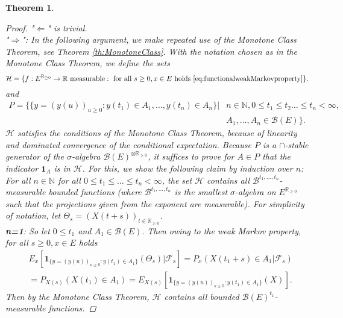 \documentclass[12pt,a4paper]{scrartcl}
\newtheorem{theorem}{Theorem}[section]
\numberwithin{equation}{section}
\newcommand{\R}{\mathbb{R}} %
\newcommand{\N}{\mathbb{N}} %
\begin{document}
\begin{theorem}
\begin{proof}
"$\Leftarrow$" is trivial.\\
"$\Rightarrow$": In the following argument, we make repeated use of the Monotone Class Theorem, see Theorem \ref{th:MonotoneClass}. With the notation chosen as in the Monotone Class Theorem, we define the sets
$$\mathcal{H} = \lbrace f: E^{\R_{\geq 0}} \to \R \textnormal{ measurable}: \textnormal{ for all } s \geq 0, x \in E \textnormal{ holds \eqref{eq:functionalweakMarkovproperty}} \rbrace. $$ and
\begin{align*}
P = \lbrace \lbrace y = \left(y\left(u\right) \right)_{u \geq 0}: y\left(t_1\right) \in A_1, \ldots , y\left(t_n\right) \in A_n \rbrace |& n \in \N, 0 \leq t_1 \leq t_2 \ldots \leq t_n < \infty, \\
&A_1, \ldots , A_n \in \mathcal{B}\left(E\right) \rbrace.
\end{align*}
$\mathcal{H}$ satisfies the conditions of the Monotone Class Theorem, because of linearity and dominated convergence of the conditional expectation. Because $P$ is a $\cap$-stable generator of the $\sigma$-algebra $\mathcal{B}\left(E\right)^{\otimes \R_{\geq 0}}$, it suffices to prove for $A \in P$ that the indicator $\textbf{1}_A$ is in $\mathcal{H}$. For this, we show the following claim by induction over $n$:\\
For all $n \in \N$ for all $0 \leq t_1 \leq \ldots \leq t_n < \infty $, the set $\mathcal{H}$ contains all $\mathcal{B}^{t_1,\ldots,t_n}$-measurable bounded functions (where $\mathcal{B}^{t_1,\ldots,t_n}$ is the smallest $\sigma$-algebra on $E^{\R_{\geq 0}}$ such that the projections given from the exponent are measurable). For simplicity of notation, let $\Theta_s = \left(X\left(t+s\right)\right)_{t \in \R_{\geq 0}}$.\\
\textbf{n=1}: So let $0 \leq t_1$ and $A_1 \in \mathcal{B}\left(E\right).$ Then owing to the weak Markov property, for all $s\geq 0, x \in E$ holds 
\begin{align*}
&E_x\left[\textbf{1}_{\lbrace y=\left(y\left(u\right)\right)_{u \geq 0}: y\left(t_1\right) \in A_1 \rbrace}\left( \Theta_s \right)| \mathcal{F}_s \right] = P_x\left( X\left(t_1 + s \right) \in A_1 |\mathcal{F}_s\right) \\
&= P_{X\left(s\right)} \left(X\left(t_1\right) \in A_1 \right) = E_{X\left(s\right)}\left[\textbf{1}_{\lbrace y=\left(y\left(u\right)\right)_{u \geq 0}: y\left(t_1\right) \in A_1 \rbrace}\left(X\right) \right].
\end{align*}
Then by the Monotone Class Theorem, $\mathcal{H}$ contains all bounded $\mathcal{B}\left(E\right)^{t_1}$-measurable functions.


\end{proof}
\end{theorem}
\end{document}
